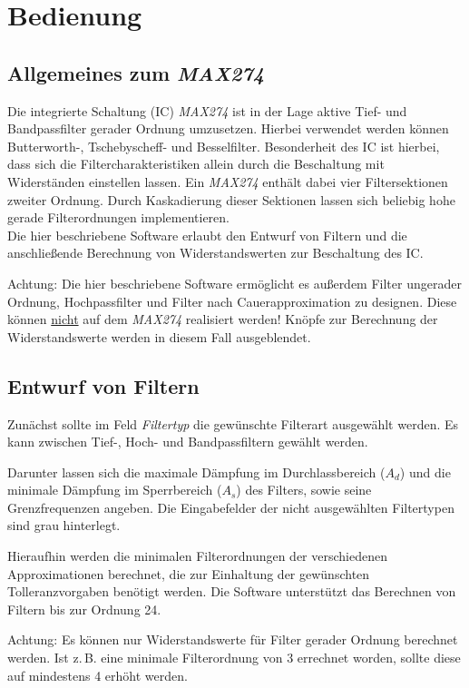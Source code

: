 \section{Bedienung}

\subsection{Allgemeines zum \textit{MAX274}}
Die integrierte Schaltung (IC) \textit{MAX274} ist in der Lage aktive Tief- und Bandpassfilter gerader Ordnung umzusetzen. Hierbei verwendet werden können Butterworth-, Tschebyscheff- und Besselfilter. 
Besonderheit des IC ist hierbei, dass sich die Filtercharakteristiken allein durch die Beschaltung mit Widerständen einstellen lassen.
Ein \textit{MAX274} enthält dabei vier Filtersektionen zweiter Ordnung. 
Durch Kaskadierung dieser Sektionen lassen sich beliebig hohe gerade Filterordnungen implementieren.
\\ \newline
Die hier beschriebene Software erlaubt den Entwurf von Filtern und die anschließende Berechnung von Widerstandswerten zur Beschaltung des IC.

Achtung: Die hier beschriebene Software ermöglicht es außerdem Filter ungerader Ordnung, Hochpassfilter und Filter nach Cauerapproximation zu designen. Diese können \underline{nicht} auf dem \textit{MAX274} realisiert werden!
Knöpfe zur Berechnung der Widerstandswerte werden in diesem Fall ausgeblendet.

\subsection{Entwurf von Filtern}

Zunächst sollte im Feld \textit{Filtertyp} die gewünschte Filterart ausgewählt werden.
Es kann zwischen Tief-, Hoch- und Bandpassfiltern gewählt werden.

Darunter lassen sich die maximale Dämpfung im Durchlassbereich ($A_d$) und die minimale Dämpfung im Sperrbereich ($A_s$) des Filters, sowie seine Grenzfrequenzen angeben. 
Die Eingabefelder der nicht ausgewählten Filtertypen sind grau hinterlegt.

Hieraufhin werden die minimalen Filterordnungen der verschiedenen Approximationen berechnet, die zur Einhaltung der gewünschten Tolleranzvorgaben benötigt werden.
Die Software unterstützt das Berechnen von Filtern bis zur Ordnung 24.

Achtung: Es können nur Widerstandswerte für Filter gerader Ordnung berechnet werden.
Ist z.\,B. eine minimale Filterordnung von 3 errechnet worden, sollte diese auf mindestens 4 erhöht werden.

